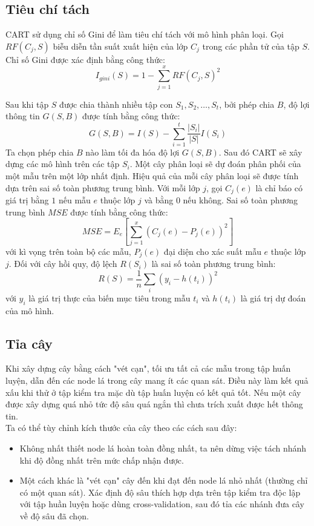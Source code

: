 \subsection{Tiêu chí tách}
CART sử dụng chỉ số Gini để làm tiêu chí tách với mô hình phân loại. Gọi $RF(C_j,S)$ biễu diễn tần suất xuất hiện của lớp $C_j$ trong các phần tử của tập $S$. Chỉ số Gini được xác định bằng công thức:
$$I_{gini}(S)=1- \sum^x_{j=1}RF(C_j,S)^2$$

Sau khi tập $S$ được chia thành nhiều tập con $S_1,S_2,\ldots,S_t$, bởi phép chia $B$, độ lợi thông tin $G(S,B)$ được tính bằng công thức:
$$G(S,B) = I(S) - \sum^t_{i=1}\frac{|S_i|}{|S|}I(S_i)$$
Ta chọn phép chia $B$ nào làm tối đa hóa độ lợi $G(S,B)$.
Sau đó CART sẽ xây dựng các mô hình trên các tập $S_i$. Một cây phân loại sẽ dự đoán phân phối của một mẫu trên một lớp nhất định. Hiệu quả của mỗi cây phân loại sẽ được tính dựa trên sai số toàn phương trung bình. Với mỗi lớp $j$, gọi $C_j(e)$ là chỉ báo có giá trị bằng $1$ nếu mẫu $e$ thuộc lớp $j$ và bằng $0$ nếu không. Sai số toàn phương trung bình $MSE$ được tính bằng công thức:
$$MSE=E_e\left[\sum^x_{j=1}(C_j(e)-P_j(e))^2\right]$$
với kì vọng trên toàn bộ các mẫu, $P_j(e)$ đại diện cho xác suất mẫu $e$ thuộc lớp $j$. Đối với cây hồi quy, độ lệch  $R(S_i)$ là sai số toàn phương trung bình:
$$R(S) = \frac{1}{n}\sum_i(y_i - h(t_i))^2$$
với $y_i$ là giá trị thực của biến mục tiêu trong mẫu $t_i$ và $h(t_i)$ là giá trị dự đoán của mô hình.\\


\subsection{Tỉa cây}
Khi xây dựng cây bằng cách "vét cạn", tối ưu tất cả các mẫu trong tập huấn luyện, dẫn đến các node lá trong cây mang ít các quan sát. Điều này làm kết quả xấu khi thử ở tập kiểm tra mặc dù tập huấn luyện có kết quả tốt. Nếu một cây được xây dựng quá nhỏ tức độ sâu quá ngắn thì chưa trích xuất được hết thông tin.\\
Ta có thể tùy chỉnh kích thước của cây theo các cách sau đây:
\begin{itemize}
\item Không nhất thiết node lá hoàn toàn đồng nhất, ta nên dừng việc tách nhánh khi độ đồng nhất trên mức chấp nhận được.
\item Một cách khác là "vét cạn" cây đến khi đạt đến node lá nhỏ nhất (thường chỉ có một quan sát). Xác định độ sâu thích hợp dựa trên tập kiểm tra độc lập với tập huần luyện  hoặc dùng cross-validation, sau đó tỉa các nhánh đưa cây về độ sâu đã chọn.
\end{itemize}


